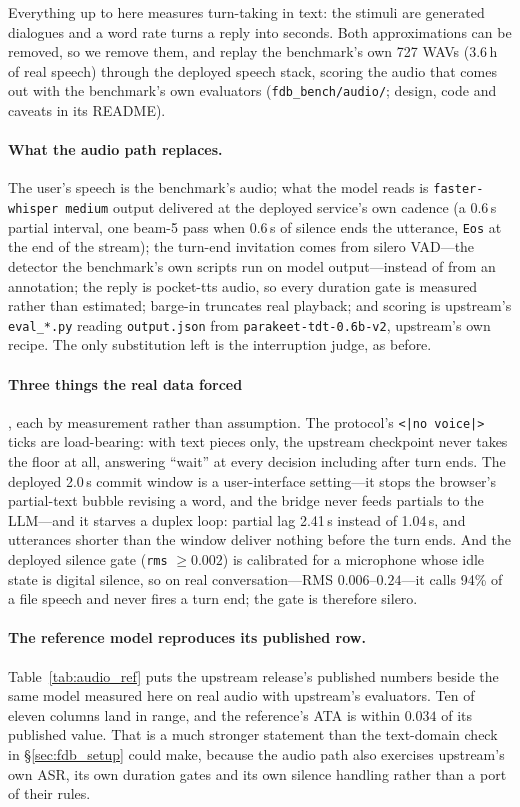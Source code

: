 \documentclass[conference]{IEEEtran}
\begin{document}
Everything up to here measures turn-taking in text: the stimuli are generated
dialogues and a word rate turns a reply into seconds. Both approximations can be
removed, so we remove them, and replay the benchmark's own 727 WAVs (3.6\,h of
real speech) through the deployed speech stack, scoring the audio that comes out
with the benchmark's own evaluators (\texttt{fdb\_bench/audio/}; design, code and
caveats in its README).

\paragraph{What the audio path replaces.} The user's speech is the benchmark's
audio; what the model reads is \texttt{faster-whisper medium} output delivered at
the deployed service's own cadence (a 0.6\,s partial interval, one beam-5 pass
when 0.6\,s of silence ends the utterance, \texttt{Eos} at the end of the stream);
the turn-end invitation comes from silero VAD---the detector the benchmark's own
scripts run on model output---instead of from an annotation; the reply is
pocket-tts audio, so every duration gate is measured rather than estimated;
barge-in truncates real playback; and scoring is upstream's \texttt{eval\_*.py}
reading \texttt{output.json} from \texttt{parakeet-tdt-0.6b-v2}, upstream's own
recipe. The only substitution left is the interruption judge, as before.

\paragraph{Three things the real data forced}, each by measurement rather than
assumption. The protocol's \texttt{<|no voice|>} ticks are load-bearing: with text
pieces only, the upstream checkpoint never takes the floor at all, answering
``wait'' at every decision including after turn ends. The deployed 2.0\,s commit
window is a user-interface setting---it stops the browser's partial-text bubble
revising a word, and the bridge never feeds partials to the LLM---and it starves a
duplex loop: partial lag 2.41\,s instead of 1.04\,s, and utterances shorter than
the window deliver nothing before the turn ends. And the deployed silence gate
(\texttt{rms} $\ge 0.002$) is calibrated for a microphone whose idle state is
digital silence, so on real conversation---RMS $0.006$--$0.24$---it calls 94\% of
a file speech and never fires a turn end; the gate is therefore silero.

\paragraph{The reference model reproduces its published row.}
Table~\ref{tab:audio_ref} puts the upstream release's published numbers beside the
same model measured here on real audio with upstream's evaluators. Ten of eleven
columns land in range, and the reference's ATA is within $0.034$ of its published
value. That is a much stronger statement than the text-domain check in
\S\ref{sec:fdb_setup} could make, because the audio path also exercises upstream's
own ASR, its own duration gates and its own silence handling rather than a port of
their rules.
\end{document}
